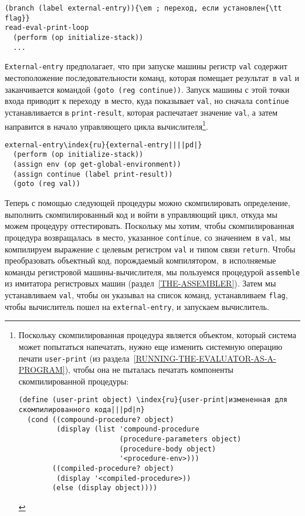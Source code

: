 \begin{Verbatim}[fontsize=\small]
  (branch (label external-entry)){\em ; переход, если установлен{\tt flag}}
read-eval-print-loop
  (perform (op initialize-stack))
  ...
\end{Verbatim}
{\tt External-entry} предполагает, что при запуске машины
регистр {\tt val} содержит местоположение последовательности
команд, которая помещает результат~в {\tt val} и заканчивается
командой {\tt (goto (reg continue))}.  Запуск машины с этой
точки входа приводит к переходу~в место, куда показывает
{\tt val}, но сначала {\tt continue} устанавливается в
{\tt print-result}, которая распечатает значение
{\tt val}, а затем направится в начало управляющего цикла
вычислителя\footnote{Поскольку скомпилированная процедура является объектом,
который система может попытаться напечатать, нужно еще изменить
системную операцию печати {\tt user-print} (из 
раздела~\ref{RUNNING-THE-EVALUATOR-AS-A-PROGRAM}), чтобы она не
пыталась печатать компоненты скомпилированной процедуры:

\begin{Verbatim}
(define (user-print object) \index{ru}{user-print|измененная для скомпилированного кода|||pd|п}
  (cond ((compound-procedure? object)
         (display (list 'compound-procedure
                        (procedure-parameters object)
                        (procedure-body object)
                        '<procedure-env>)))
        ((compiled-procedure? object)
         (display '<compiled-procedure>))
        (else (display object))))
\end{Verbatim}
}.%

\begin{Verbatim}[fontsize=\small]
external-entry\index{ru}{external-entry||||pd|}
  (perform (op initialize-stack))
  (assign env (op get-global-environment))
  (assign continue (label print-result))
  (goto (reg val))
\end{Verbatim}

Теперь с помощью следующей процедуры можно скомпилировать
определение, выполнить скомпилированный код и войти в
управляющий цикл, откуда мы можем процедуру оттестировать.  Поскольку
мы хотим, чтобы скомпилированная процедура возвращалась~в место,
указанное {\tt continue}, со значением~в {\tt val}, мы
компилируем выражение с целевым регистром {\tt val} и типом
связи {\tt return}.  Чтобы преобразовать объектный код,
порождаемый компилятором,~в исполняемые команды регистровой
машины-вычислителя, мы пользуемся процедурой {\tt assemble} из
имитатора регистровых машин (раздел~\ref{THE-ASSEMBLER}).
Затем мы устанавливаем {\tt val}, чтобы он указывал на список
команд, устанавливаем {\tt flag}, чтобы вычислитель пошел на
{\tt external-entry}, и запускаем вычислитель.


